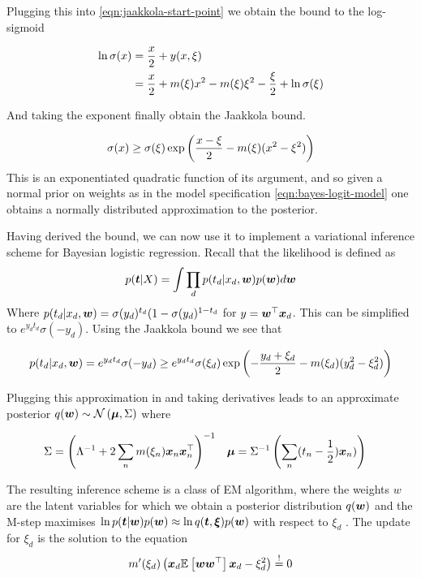 Plugging this into \eqref{eqn:jaakkola-start-point} we obtain the bound to the log-sigmoid

\begin{align}
\begin{split}
\ln \sigma(x) & = \frac{x}{2} + y(x, \xi) \\
 & = \frac{x}{2} + m(\xi)x^2 - m(\xi)\xi^2 - \frac{\xi}{2} + \ln \sigma(\xi)
\end{split}
\end{align}

And taking the exponent finally obtain the Jaakkola\cite{Jaakkola1997} bound.

\begin{align}
\sigma(x) \geq \sigma(\xi)\exp \left(\frac{x - \xi}{2} - m(\xi)(x^2 - \xi^2) \right)
\end{align}
This is an exponentiated quadratic function of its argument, and so given a normal prior on weights as in the model specification \eqref{eqn:bayes-logit-model} one obtains a normally distributed approximation to the posterior.

Having derived the bound, we can now use it to implement a variational inference scheme for Bayesian logistic regression. Recall that the likelihood is defined as
\begin{align}
p(\bm t|X) = \int \prod_d p(t_d | x_d, \bm w) p(\bm w) d\bm w
\end{align}
Where $p(t_d | x_d, \bm w) = \sigma(y_d)^{t_d}(1- \sigma(y_d)^{1-t_d}$ for $y = \bm w^\top\bm x_d$. This can be simplified to $e^{y_d t_d}\sigma(-y_d)$. Using the Jaakkola bound we see that

\begin{equation}
p(t_d | x_d, \bm w) = e^{y_d t_d}\sigma(-y_d) \geq e^{y_d t_d} \sigma(\xi_d) \exp\left( -\frac{y_d + \xi_d}{2} - m(\xi_d)(y_d^2 - \xi_d^2)\right)
\end{equation}

Plugging this approximation in and taking derivatives leads to an approximate posterior $q(\bm w) \sim \mathcal{N} \left( {\bm \mu}, {\Sigma} \right)$ where

\begin{align}
\Sigma & = {\left( {\Lambda}^{-1} + 2 \sum_n m(\xi_n)\bm x_n\bm x_n^\top \right)}^{-1} & \bm \mu & = {\Sigma}^{-1} \left(\sum_n (t_n - \frac{1}{2}) \bm x_n)\right)
\end{align}

The resulting inference scheme is a class of EM algorithm, where the weights $w$ are the latent variables for which we obtain a posterior distribution $q(\bm w)$ and the M-step maximises $\ln p(\bm t| \bm w)p(\bm w) \approx \ln q(\bm t, \bm \xi)p(\bm w)$  with respect to $\xi_d$ . The update for $\xi_d$ is the solution to the equation
\begin{align}
m'(\xi_d) \left( \bm x_d \mathbb{E}_{ {  } }\left[ \bm w\bm w^\top \right]\bm x_d - \xi^2_d \right) \overset{!}{=} 0
\end{align}

